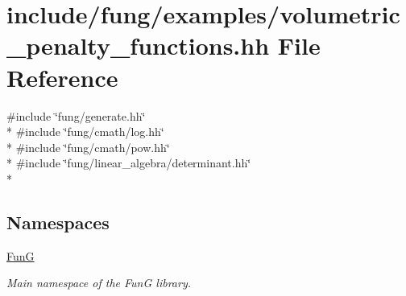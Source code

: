 \hypertarget{volumetric__penalty__functions_8hh}{\section{include/fung/examples/volumetric\-\_\-penalty\-\_\-functions.hh File Reference}
\label{volumetric__penalty__functions_8hh}
}
{\ttfamily \#include \char`\"{}fung/generate.\-hh\char`\"{}}\\*
{\ttfamily \#include \char`\"{}fung/cmath/log.\-hh\char`\"{}}\\*
{\ttfamily \#include \char`\"{}fung/cmath/pow.\-hh\char`\"{}}\\*
{\ttfamily \#include \char`\"{}fung/linear\-\_\-algebra/determinant.\-hh\char`\"{}}\\*
\subsection*{Namespaces}
\begin{DoxyCompactItemize}
\item 
\hyperlink{namespaceFunG}{Fun\-G}
\begin{DoxyCompactList}\small\item\em Main namespace of the Fun\-G library. \end{DoxyCompactList}\end{DoxyCompactItemize}
